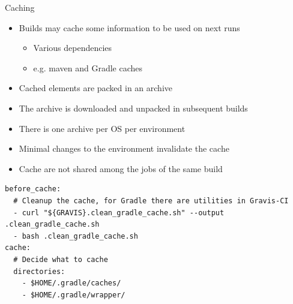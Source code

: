 \documentclass[presentation]{beamer}
\begin{document}
\begin{frame}[fragile]{Caching}
    \begin{itemize}
        \item Builds may cache some information to be used on next runs
        \begin{itemize}
            \item Various dependencies
            \item e.g. maven and Gradle caches
        \end{itemize}
        \item Cached elements are packed in an archive
        \item The archive is downloaded and unpacked in subsequent builds
        \item There is one archive per OS per environment
        \item Minimal changes to the environment invalidate the cache
        \item Cache are not shared among the jobs of the same build
    \end{itemize}
    \begin{block}{}
        \begin{verbatim}
before_cache:
  # Cleanup the cache, for Gradle there are utilities in Gravis-CI
  - curl "${GRAVIS}.clean_gradle_cache.sh" --output .clean_gradle_cache.sh
  - bash .clean_gradle_cache.sh
cache:
  # Decide what to cache
  directories:
    - $HOME/.gradle/caches/
    - $HOME/.gradle/wrapper/
        \end{verbatim}
    \end{block}
\end{frame}
\end{document}

